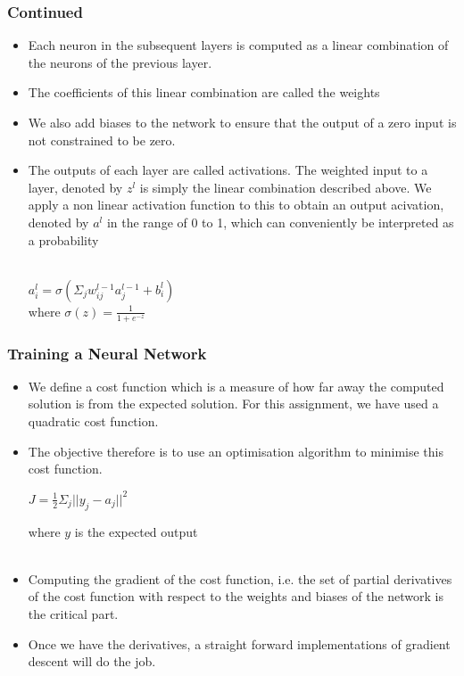 \documentclass{beamer}
\begin{document}
\begin{frame}
\frametitle{Continued}
\begin{itemize}
\item Each neuron in the subsequent layers is computed as a linear combination of the neurons of the previous layer.
\item The coefficients of this linear combination are called the weights
\item We also add biases to the network to ensure that the output of a zero input is not constrained to be zero.
\item The outputs of each layer are called activations. The weighted input to a layer, denoted by $z^l$ is simply the linear combination described above. We apply a non linear activation function to this to obtain an output acivation, denoted by $a^l$ in the range of 0 to 1, which can conveniently be interpreted as a probability
\\~\\
\begin{center}
$a_i^l = \sigma(\Sigma_j w_{ij}^{l-1}a_j^{l-1} + b_i^l)$\\
where $\sigma(z) = \frac{1}{1+e^{-z}}$
\end{center}
\end{itemize}
\end{frame}


\begin{frame}
\frametitle{Training a Neural Network}
\begin{itemize}
\item We define a cost function which is a measure of how far away the computed solution is from the expected solution. For this assignment, we have used a quadratic cost function.
\item The objective therefore is to use an optimisation algorithm to minimise this cost function.
\begin{center}
$J = \frac{1}{2} \Sigma_j ||y_j - a_j||^2$ 
\end{center}
where $y$ is the expected output \\~\\

\item Computing the gradient of the cost function, i.e. the set of partial derivatives of the cost function with respect to the weights and biases of the network is the critical part.
\item Once we have the derivatives, a straight forward implementations of gradient descent will do the job.
\end{itemize}
\end{frame}
\end{document}
